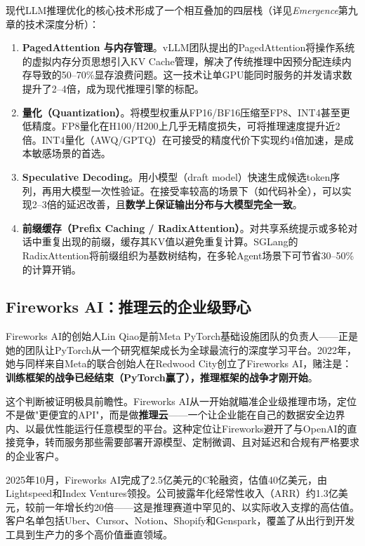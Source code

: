 \begin{corebox}
现代LLM推理优化的核心技术形成了一个相互叠加的四层栈（详见\textit{Emergence}第九章的技术深度分析）：
\begin{enumerate}[noitemsep]
  \item \textbf{PagedAttention 与内存管理}。vLLM团队提出的PagedAttention将操作系统的虚拟内存分页思想引入KV Cache管理，解决了传统推理中因预分配连续内存导致的50--70\%显存浪费问题。这一技术让单GPU能同时服务的并发请求数提升了2--4倍，成为现代推理引擎的标配。
  \item \textbf{量化（Quantization）}。将模型权重从FP16/BF16压缩至FP8、INT4甚至更低精度。FP8量化在H100/H200上几乎无精度损失，可将推理速度提升近2倍。INT4量化（AWQ/GPTQ）在可接受的精度代价下实现约4倍加速，是成本敏感场景的首选。
  \item \textbf{Speculative Decoding}。用小模型（draft model）快速生成候选token序列，再用大模型一次性验证。在接受率较高的场景下（如代码补全），可以实现2--3倍的延迟改善，且\textbf{数学上保证输出分布与大模型完全一致}。
  \item \textbf{前缀缓存（Prefix Caching / RadixAttention）}。对共享系统提示或多轮对话中重复出现的前缀，缓存其KV值以避免重复计算。SGLang的RadixAttention将前缀组织为基数树结构，在多轮Agent场景下可节省30--50\%的计算开销。
\end{enumerate}
\end{corebox}

\subsection{Fireworks AI：推理云的企业级野心}
\label{subsec:fireworks}

Fireworks AI的创始人Lin Qiao是前Meta PyTorch基础设施团队的负责人——正是她的团队让PyTorch从一个研究框架成长为全球最流行的深度学习平台。2022年，她与同样来自Meta的联合创始人在Redwood City创立了Fireworks AI，赌注是：\textbf{训练框架的战争已经结束（PyTorch赢了），推理框架的战争才刚开始}。

这个判断被证明极具前瞻性。Fireworks AI从一开始就瞄准企业级推理市场，定位不是做"更便宜的API"，而是做\textbf{推理云}——一个让企业能在自己的数据安全边界内、以最优性能运行任意模型的平台。这种定位让Fireworks避开了与OpenAI的直接竞争，转而服务那些需要部署开源模型、定制微调、且对延迟和合规有严格要求的企业客户。

2025年10月，Fireworks AI完成了2.5亿美元的C轮融资，估值40亿美元，由Lightspeed和Index Ventures领投。公司披露年化经常性收入（ARR）约1.3亿美元，较前一年增长约20倍——这是推理赛道中罕见的、以实际收入支撑的高估值。客户名单包括Uber、Cursor、Notion、Shopify和Genspark，覆盖了从出行到开发工具到生产力的多个高价值垂直领域。

